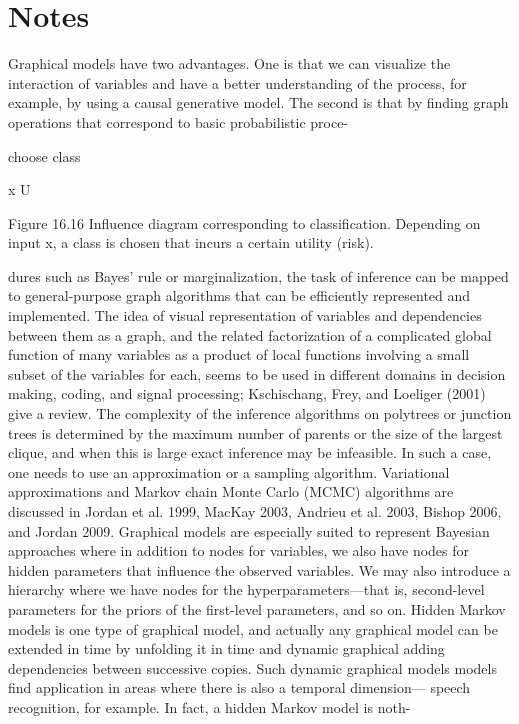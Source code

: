\section{Notes}

Graphical models have two advantages. One is that we can visualize the interaction of variables and have a better understanding of the process, for example, by using a causal generative model. The second is that by finding graph operations that correspond to basic probabilistic proce-

choose class

x U

Figure 16.16 Influence diagram corresponding to classification. Depending on input x, a class is chosen that incurs a certain utility (risk).

dures such as Bayes’ rule or marginalization, the task of inference can be mapped to general-purpose graph algorithms that can be efficiently represented and implemented. The idea of visual representation of variables and dependencies between them as a graph, and the related factorization of a complicated global function of many variables as a product of local functions involving a small subset of the variables for each, seems to be used in different domains in decision making, coding, and signal processing; Kschischang, Frey, and Loeliger (2001) give a review. The complexity of the inference algorithms on polytrees or junction trees is determined by the maximum number of parents or the size of the largest clique, and when this is large exact inference may be infeasible. In such a case, one needs to use an approximation or a sampling algorithm. Variational approximations and Markov chain Monte Carlo (MCMC) algorithms are discussed in Jordan et al. 1999, MacKay 2003, Andrieu et al. 2003, Bishop 2006, and Jordan 2009. Graphical models are especially suited to represent Bayesian approaches where in addition to nodes for variables, we also have nodes for hidden parameters that influence the observed variables. We may also introduce a hierarchy where we have nodes for the hyperparameters---that is, second-level parameters for the priors of the first-level parameters, and so on. Hidden Markov models is one type of graphical model, and actually any graphical model can be extended in time by unfolding it in time and dynamic graphical adding dependencies between successive copies. Such dynamic graphical models models find application in areas where there is also a temporal dimension--- speech recognition, for example. In fact, a hidden Markov model is noth-

